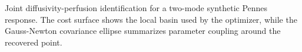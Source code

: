 \caption{Joint diffusivity-perfusion identification for a two-mode synthetic Pennes response. The cost surface shows the local basin used by the optimizer, while the Gauss-Newton covariance ellipse summarizes parameter coupling around the recovered point.}\label{fig:multi-parameter-identifiability}

